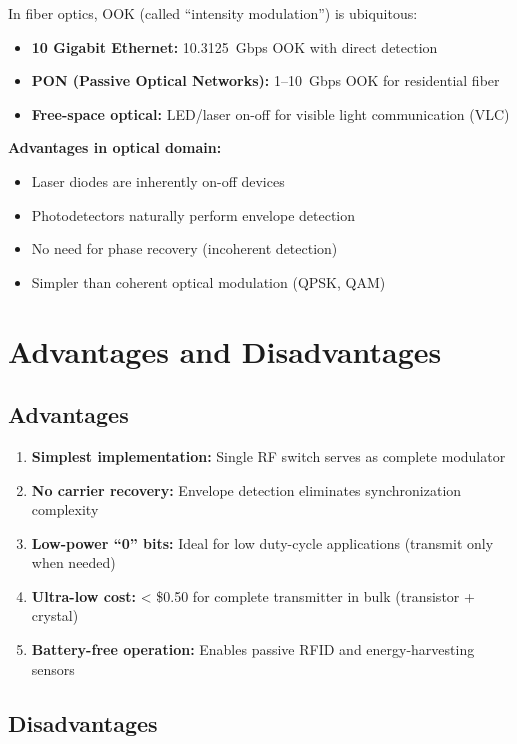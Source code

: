 In fiber optics, OOK (called ``intensity modulation'') is ubiquitous:

\begin{itemize}
\item \textbf{10 Gigabit Ethernet:} 10.3125~Gbps OOK with direct detection
\item \textbf{PON (Passive Optical Networks):} 1--10~Gbps OOK for residential fiber
\item \textbf{Free-space optical:} LED/laser on-off for visible light communication (VLC)
\end{itemize}

\textbf{Advantages in optical domain:}
\begin{itemize}
\item Laser diodes are inherently on-off devices
\item Photodetectors naturally perform envelope detection
\item No need for phase recovery (incoherent detection)
\item Simpler than coherent optical modulation (QPSK, QAM)
\end{itemize}

\section{Advantages and Disadvantages}

\subsection*{Advantages}

\begin{enumerate}
\item \textbf{Simplest implementation:} Single RF switch serves as complete modulator
\item \textbf{No carrier recovery:} Envelope detection eliminates synchronization complexity
\item \textbf{Low-power ``0'' bits:} Ideal for low duty-cycle applications (transmit only when needed)
\item \textbf{Ultra-low cost:} < \$0.50 for complete transmitter in bulk (transistor + crystal)
\item \textbf{Battery-free operation:} Enables passive RFID and energy-harvesting sensors
\end{enumerate}

\subsection*{Disadvantages}

